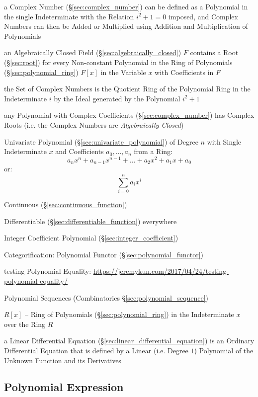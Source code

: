 a Complex Number (\S\ref{sec:complex_number}) can be defined as a Polynomial in
the single Indeterminate with the Relation $i^2 + 1 = 0$ imposed, and Complex
Numbers can then be Added or Multiplied using Addition and Multiplication of
Polynomials

an Algebraically Closed Field (\S\ref{sec:algebraically_closed}) $F$ contains a
Root (\S\ref{sec:root}) for every Non-constant Polynomial in the Ring of
Polynomials (\S\ref{sec:polynomial_ring}) $F[x]$ in the Variable $x$ with
Coefficients in $F$

the Set of Complex Numbers is the Quotient Ring of the Polynomial Ring in the
Indeterminate $i$ by the Ideal generated by the Polynomial $i^2 + 1$

any Polynomial with Complex Coefficients (\S\ref{sec:complex_number}) has
Complex Roots (i.e. the Complex Numbers are \emph{Algebraically Closed})

Univariate Polynomial (\S\ref{sec:univariate_polynomial}) of Degree
$n$ with Single Indeterminate $x$ and Coefficients $a_0, \ldots, a_n$
from a Ring:
\[
  a_n x^n + a_{n-1} x^{n-1} + \ldots + a_2 x^2 + a_1 x + a_0
\]
or:
\[
  \sum_{i=0}^n a_i x^i
\]

Continuous (\S\ref{sec:continuous_function})

Differentiable (\S\ref{sec:differentiable_function}) everywhere

Integer Coefficient Polynomial (\S\ref{sec:integer_coefficient})

Categorification: Polynomial Functor (\S\ref{sec:polynomial_functor})

testing Polynomial Equality:
\url{https://jeremykun.com/2017/04/24/testing-polynomial-equality/}

\fist Polynomial Sequences (Combinatorics \S\ref{sec:polynomial_sequence})

$R[x]$ -- Ring of Polynomials (\S\ref{sec:polynomial_ring}) in the
Indeterminate $x$ over the Ring $R$

a Linear Differential Equation (\S\ref{sec:linear_differential_equation}) is an
Ordinary Differential Equation that is defined by a Linear (i.e. Degree $1$)
Polynomial of the Unknown Function and its Derivatives



\subsection{Polynomial Expression}\label{sec:polynomial_expression}


